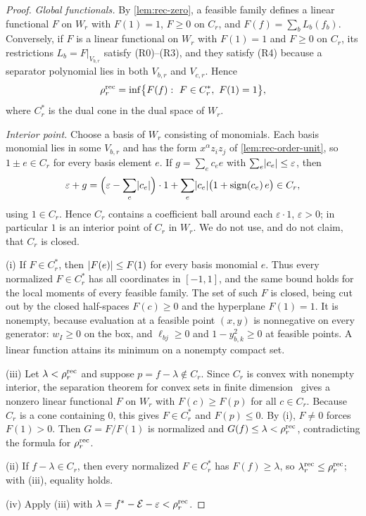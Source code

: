 \begin{proof}
\emph{Global functionals.} By \cref{lem:rec-zero}, a feasible family
defines a linear functional $F$ on $W_r$ with $F(1)=1$, $F\ge0$ on $C_r$, and
$F(f)=\sum_bL_b(f_b)$. Conversely, if $F$ is a linear functional on $W_r$
with $F(1)=1$ and $F\ge0$ on $C_r$, its restrictions $L_b=F|_{V_{b,r}}$
satisfy (R0)--(R3), and they satisfy (R4) because a separator polynomial lies
in both $V_{b,r}$ and $V_{c,r}$. Hence
\[
  \rho^{\mathrm{rec}}_r=\inf\bigl\{F(f):\ F\in C_r^*,\ F(1)=1\bigr\},
\]
where $C_r^*$ is the dual cone in the dual space of $W_r$.

\emph{Interior point.} Choose a basis of $W_r$ consisting of monomials. Each
basis monomial lies in some $V_{b,r}$ and has the form $x^\alpha z_iz_j$ of
\cref{lem:rec-order-unit}, so $1\pm e\in C_r$ for every basis element $e$.
If $g=\sum_ec_ee$ with $\sum_e\lvert c_e\rvert\le\varepsilon$, then
\[
  \varepsilon+g=\Bigl(\varepsilon-\sum_e\lvert c_e\rvert\Bigr)\cdot1
  +\sum_e\lvert c_e\rvert\bigl(1+\operatorname{sign}(c_e)\,e\bigr)\in C_r,
\]
using $1\in C_r$. Hence $C_r$ contains a coefficient ball around each
$\varepsilon\cdot1$, $\varepsilon>0$; in particular $1$ is an interior point of
$C_r$ in $W_r$. We do not use, and do not claim, that $C_r$ is closed.

(i) If $F\in C_r^*$, then $\lvert F(e)\rvert\le F(1)$ for every basis monomial $e$.
Thus every normalized $F\in C_r^*$ has all coordinates in $[-1,1]$, and the
same bound holds for the local moments of every feasible family. The set of
such $F$ is closed, being cut out by the closed half-spaces $F(c)\ge0$ and
the hyperplane $F(1)=1$. It is nonempty, because evaluation at a feasible
point $(x,y)$ is nonnegative on every generator: $w_I\ge0$ on the box, and
$\ell_{bj}\ge0$ and $1-y_{b,k}^2\ge0$ at feasible points. A linear function
attains its minimum on a nonempty compact set.

(iii) Let $\lambda<\rho^{\mathrm{rec}}_r$ and suppose $p=f-\lambda\notin C_r$. Since $C_r$
is convex with nonempty interior, the separation theorem for convex sets in
finite dimension~\cite[Theorem~2.4.2]{bental2001-lectures-modern-convex} gives a nonzero
linear functional $F$ on $W_r$ with $F(c)\ge F(p)$ for all $c\in C_r$.
Because $C_r$ is a cone containing $0$, this gives $F\in C_r^*$ and
$F(p)\le0$. By (i), $F\ne0$ forces $F(1)>0$. Then $G=F/F(1)$ is normalized
and $G(f)\le\lambda<\rho^{\mathrm{rec}}_r$, contradicting the formula for $\rho^{\mathrm{rec}}_r$.

(ii) If $f-\lambda\in C_r$, then every normalized $F\in C_r^*$ has
$F(f)\ge\lambda$, so $\lambda^{\mathrm{rec}}_r\le\rho^{\mathrm{rec}}_r$; with (iii),
equality holds.

(iv) Apply (iii) with $\lambda=f^{*}-\mathcal E-\varepsilon<\rho^{\mathrm{rec}}_r$.
\end{proof}

